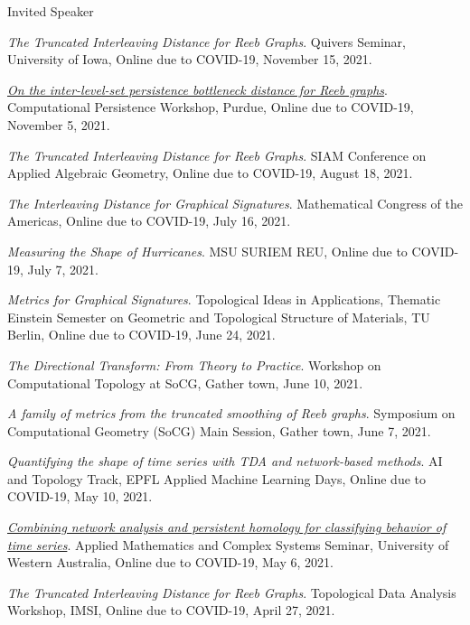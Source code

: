 \documentclass{resume} %
\begin{document}
\begin{rSection}{Invited Speaker}
\begin{etaremune}
\item\emph{The Truncated Interleaving Distance for Reeb Graphs}. Quivers Seminar, University of Iowa, Online due to COVID-19, November 15, 2021. 

\item\emph{\href{https://drive.google.com/file/d/1lnZ_g1aQBkX4W6F9SRovgQ8Bzih1Is97/view?usp=sharing}{On the inter-level-set persistence bottleneck distance for Reeb graphs}}. Computational Persistence Workshop, Purdue, Online due to COVID-19, November 5, 2021. 

\item\emph{The Truncated Interleaving Distance for Reeb Graphs}. SIAM Conference on Applied Algebraic Geometry, Online due to COVID-19, August 18, 2021. 

\item\emph{The Interleaving Distance for Graphical Signatures}. Mathematical Congress of the Americas, Online due to COVID-19, July 16, 2021. 

\item\emph{Measuring the Shape of Hurricanes}. MSU SURIEM REU, Online due to COVID-19, July 7, 2021. 

\item\emph{Metrics for Graphical Signatures}. Topological Ideas in Applications, Thematic Einstein Semester on Geometric and Topological Structure of Materials, TU Berlin, Online due to COVID-19, June 24, 2021. 

\item\emph{The Directional Transform: From Theory to Practice}. Workshop on Computational Topology at SoCG, Gather town, June 10, 2021. 

\item\emph{A family of metrics from the truncated smoothing of Reeb graphs}. Symposium on Computational Geometry (SoCG) Main Session, Gather town, June 7, 2021. 

\item\emph{Quantifying the shape of time series with TDA and network-based methods}. AI and Topology Track, EPFL Applied Machine Learning Days, Online due to COVID-19, May 10, 2021. 

\item\emph{\href{https://www.youtube.com/watch?v=EUVk-FXbIog}{Combining network analysis and persistent homology for classifying behavior of time series}}. Applied Mathematics and Complex Systems Seminar, University of Western Australia, Online due to COVID-19, May 6, 2021. 

\item\emph{The Truncated Interleaving Distance for Reeb Graphs}. Topological Data Analysis Workshop, IMSI, Online due to COVID-19, April 27, 2021. 


\end{etaremune}
\end{rSection}
\end{document}
